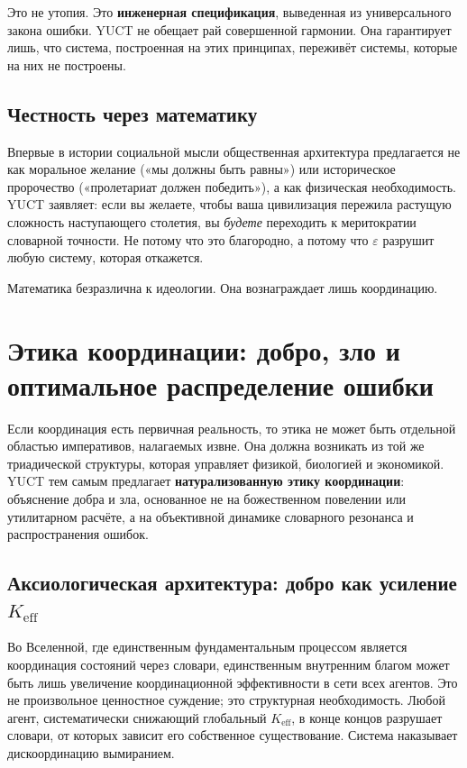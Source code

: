 \documentclass[12pt,a4paper]{article}
\begin{document}
	Это не утопия. Это \textbf{инженерная спецификация}, выведенная из универсального закона ошибки. YUCT не обещает рай совершенной гармонии. Она гарантирует лишь, что система, построенная на этих принципах, переживёт системы, которые на них не построены.
	
	\subsection{Честность через математику}
	
	Впервые в истории социальной мысли общественная архитектура предлагается не как моральное желание («мы должны быть равны») или историческое пророчество («пролетариат должен победить»), а как физическая необходимость. YUCT заявляет: если вы желаете, чтобы ваша цивилизация пережила растущую сложность наступающего столетия, вы \emph{будете} переходить к меритократии словарной точности. Не потому что это благородно, а потому что \(\varepsilon\) разрушит любую систему, которая откажется.
	
	Математика безразлична к идеологии. Она вознаграждает лишь координацию.
	
	\section{Этика координации: добро, зло и оптимальное распределение ошибки}
	\label{sec:coordination-ethics}
	
	Если координация есть первичная реальность, то этика не может быть отдельной областью императивов, налагаемых извне. Она должна возникать из той же триадической структуры, которая управляет физикой, биологией и экономикой. YUCT тем самым предлагает \textbf{натурализованную этику координации}: объяснение добра и зла, основанное не на божественном повелении или утилитарном расчёте, а на объективной динамике словарного резонанса и распространения ошибок.
	
	\subsection{Аксиологическая архитектура: добро как усиление \(K_{\mathrm{eff}}\)}
	
	Во Вселенной, где единственным фундаментальным процессом является координация состояний через словари, единственным внутренним благом может быть лишь увеличение координационной эффективности в сети всех агентов. Это не произвольное ценностное суждение; это структурная необходимость. Любой агент, систематически снижающий глобальный \(K_{\mathrm{eff}}\), в конце концов разрушает словари, от которых зависит его собственное существование. Система наказывает дискоординацию вымиранием.
	
\end{document}
